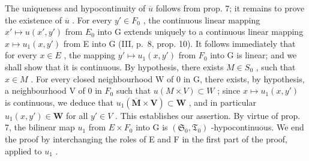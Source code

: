 The uniqueness and hypocontinuity of \(\overline{u}\) follows from prop. 7; it remains to prove the existence of \(\overline{u}\) . For every \(y' \in F_{0}\) , the continuous linear mapping \(x' \mapsto u(x', y')\) from \(E_{0}\) into G extends uniquely to a continuous linear mapping \(x \mapsto u_{1}(x, y')\) from E into G (III, p.~8, prop. 10). It follows immediately that for every \(x \in E\) , the mapping \(y' \mapsto u_{1}(x, y')\) from \(F_{0}\) into G is linear; and we shall show that it is continuous. By hypothesis, there exists \(M \in S_{0}\) , such that \(x \in M\) . For every closed neighbourhood W of 0 in G, there exists, by hypothesis, a neighbourhood V of 0 in \(F_{0}\) such that \(u(M \times V) \subset W\) ; since \(x \mapsto u_{1}(x, y')\) is continuous, we deduce that \(u_{1}(\overline{\mathbf{M}} \times \mathbf{V}) \subset \mathbf{W}\) , and in particular \(u_{1}(x, y') \in \mathbf{W}\) for all \(y' \in V\) . This establishes our assertion. By virtue of prop. 7, the bilinear map \(u_{1}\) from \(E \times F_{0}\) into G is \((\mathfrak{S}_{0}, \mathfrak{T}_{0})\) -hypocontinuous. We end the proof by interchanging the roles of E and F in the first part of the proof, applied to \(u_{1}\) .
\relax{}
